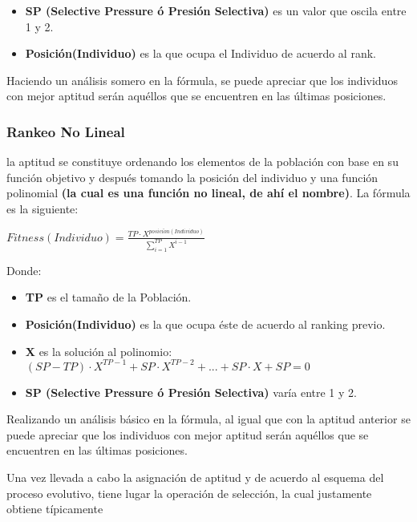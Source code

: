 \documentclass[class=report, crop=false]{standalone}
\begin{document}
\begin{itemize}
\item \textbf{SP (Selective Pressure ó Presión Selectiva)} es un valor que oscila entre 1 y 2.
\item \textbf{Posición(Individuo)} es la que ocupa el Individuo de acuerdo al rank.
\end{itemize}

Haciendo un análisis somero en la fórmula, se puede apreciar 
que los individuos con mejor aptitud serán aquéllos que se 
encuentren en las últimas posiciones.

\subsubsection{Rankeo No Lineal}
la aptitud se constituye ordenando los elementos de la 
población con base en su función objetivo y después 
tomando la posición del individuo y una función 
polinomial \textbf{(la cual es una función no lineal, de ahí el nombre)}. 
La fórmula es la siguiente:\medskip\break
\centerline{$Fitness(Individuo) = \frac{TP \cdot X^{posici\acute{o}n(Individuo)}}{\sum_{i=1}^{TP}X^{i - 1}}$}\medskip\break
Donde:

\begin{itemize}
\item \textbf{TP} es el tamaño de la Población.
\item \textbf{Posición(Individuo)} es la que ocupa éste de acuerdo al ranking previo.
\item \textbf{X} es la solución al polinomio: \((SP - TP) \cdot X^{TP - 1} + SP \cdot X^{TP - 2} + ... + SP \cdot X + SP = 0\)
\item \textbf{SP (Selective Pressure ó Presión Selectiva)} varía entre 1 y 2.
\end{itemize}

Realizando un análisis básico en la fórmula, al igual que 
con la aptitud anterior se puede apreciar que los individuos 
con mejor aptitud serán aquéllos que se encuentren en las 
últimas posiciones.

Una vez llevada a cabo la asignación de aptitud y de acuerdo
al esquema del proceso evolutivo, tiene lugar la operación de 
selección, la cual justamente obtiene típicamente  

\end{document}

